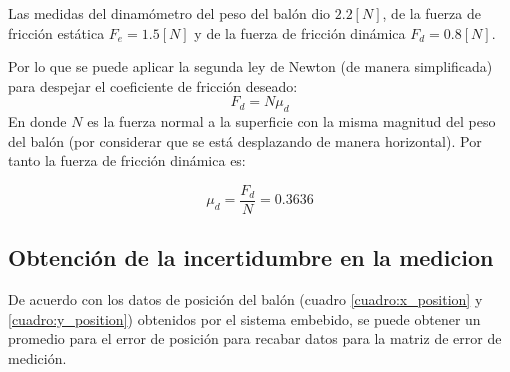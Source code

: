 	Las medidas del dinamómetro del peso del balón dio $2.2[N]$, de la fuerza de fricción estática $F_{e} = 1.5[N]$ y de la fuerza de fricción dinámica $F_{d} = 0.8[N]$. 

	Por lo que se puede aplicar la segunda ley de Newton (de manera simplificada) para despejar el coeficiente de fricción deseado:
\begin{equation}
F_d = N\mu_d 
\end{equation}
	En donde $N$ es la fuerza normal a la superficie con la misma magnitud del peso del balón (por considerar que se está desplazando de manera horizontal). Por tanto la fuerza de fricción dinámica es:
	
\begin{equation}
	\mu_d = \frac{F_d}{N}
	      = 0.3636		
\end{equation}
	
		\subsection*{Obtención de la incertidumbre en la medicion}
	De acuerdo con los datos de posición del balón (cuadro \ref{cuadro:x_position} y \ref{cuadro:y_position}) obtenidos por el sistema embebido, se puede obtener un promedio para el error de posición para recabar datos para la matriz de error de medición.

